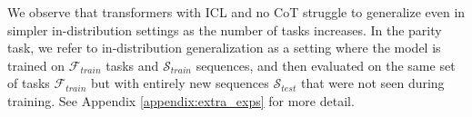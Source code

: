 \begin{remark}
    We observe that transformers with ICL and no CoT struggle to generalize even in simpler in-distribution settings as the number of tasks increases. In the parity task, we refer to in-distribution generalization as a setting where the model is trained on $\mathcal{F}_{train}$ tasks and $\mathcal{S}_{train}$ sequences, and then evaluated on the same set of tasks $\mathcal{F}_{train}$ but with entirely new sequences $\mathcal{S}_{test}$ that were not seen during training. See Appendix \ref{appendix:extra_exps} for more detail.
\end{remark}



















